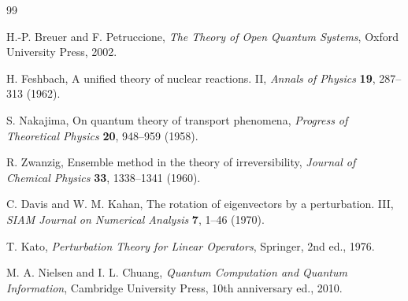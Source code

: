 \documentclass[11pt,a4paper]{article}
\begin{document}
\begin{thebibliography}{99}

H.-P. Breuer and F. Petruccione,
\textit{The Theory of Open Quantum Systems},
Oxford University Press, 2002.

H. Feshbach,
A unified theory of nuclear reactions. II,
\textit{Annals of Physics} \textbf{19}, 287--313 (1962).

S. Nakajima,
On quantum theory of transport phenomena,
\textit{Progress of Theoretical Physics} \textbf{20}, 948--959 (1958).

R. Zwanzig,
Ensemble method in the theory of irreversibility,
\textit{Journal of Chemical Physics} \textbf{33}, 1338--1341 (1960).

C. Davis and W. M. Kahan,
The rotation of eigenvectors by a perturbation. III,
\textit{SIAM Journal on Numerical Analysis} \textbf{7}, 1--46 (1970).

T. Kato,
\textit{Perturbation Theory for Linear Operators},
Springer, 2nd ed., 1976.

M. A. Nielsen and I. L. Chuang,
\textit{Quantum Computation and Quantum Information},
Cambridge University Press, 10th anniversary ed., 2010.

\end{thebibliography}
\end{document}
